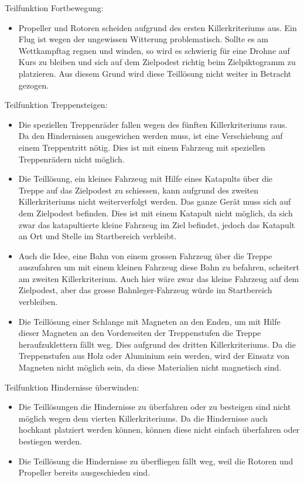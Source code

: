 Teilfunktion Fortbewegung:
\begin{itemize}
    \item Propeller und Rotoren scheiden aufgrund des ersten Killerkriteriums aus. Ein Flug ist wegen der ungewissen Witterung problematisch. Sollte es am Wettkampftag regnen und winden, so wird es schwierig für eine Drohne auf Kurs zu bleiben und sich auf dem Zielpodest richtig beim Zielpiktogramm zu platzieren. Aus diesem Grund wird diese Teillösung nicht weiter in Betracht gezogen.
 \end{itemize}

Teilfunktion Treppensteigen:
\begin{itemize}
    \item Die speziellen Treppenräder fallen wegen des fünften Killerkriteriums raus. Da den Hindernissen ausgewichen werden muss, ist eine Verschiebung auf einem Treppentritt nötig. Dies ist mit einem Fahrzeug mit speziellen Treppenrädern nicht möglich.
    \item Die Teillösung, ein kleines Fahrzeug mit Hilfe eines Katapults über die Treppe auf das Zielpodest zu schiessen, kann aufgrund des zweiten Killerkriteriums nicht weiterverfolgt werden. Das ganze Gerät muss sich auf dem Zielpodest befinden. Dies ist mit einem Katapult nicht möglich, da sich zwar das katapultierte kleine Fahrzeug im Ziel befindet, jedoch das Katapult an Ort und Stelle im Startbereich verbleibt.
    \item Auch die Idee, eine Bahn von einem grossen Fahrzeug über die Treppe auszufahren um mit einem kleinen Fahrzeug diese Bahn zu befahren, scheitert am zweiten Killerkriterium. Auch hier wäre zwar das kleine Fahrzeug auf dem Zielpodest, aber das grosse Bahnleger-Fahrzeug würde im Startbereich verbleiben.
    \item Die Teillösung einer Schlange mit Magneten an den Enden, um mit Hilfe dieser Magneten an den Vorderseiten der Treppenstufen die Treppe heraufzuklettern fällt weg. Dies aufgrund des dritten Killerkriteriums. Da die Treppenstufen aus Holz oder Aluminium sein werden, wird der Einsatz von Magneten nicht möglich sein, da diese Materialien nicht magnetisch sind.
\end{itemize}

Teilfunktion Hindernisse überwinden:
\begin{itemize}
    \item Die Teillösungen die Hindernisse zu überfahren oder zu besteigen sind nicht möglich wegen dem vierten Killerkriteriums. Da die Hindernisse auch hochkant platziert werden können, können diese nicht einfach überfahren oder bestiegen werden.
    \item Die Teillösung die Hindernisse zu überfliegen fällt weg, weil die Rotoren und Propeller bereits ausgeschieden sind.
 \end{itemize}

